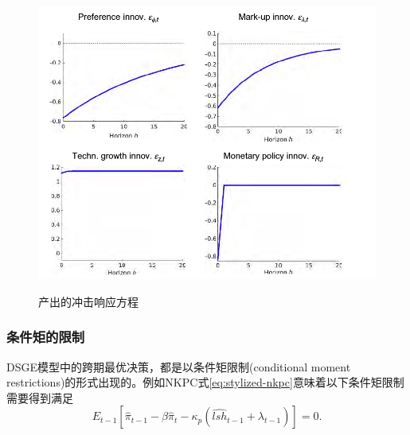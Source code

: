 \begin{figure}[htbp]
  \caption{产出的冲击响应方程}
  \centering
  \includegraphics[width=12cm]{./Figures/20180403-irfs-output}
  \label{fig:stylized-ssrep-irfs-output}
%
\end{figure}

\subsubsection{条件矩的限制}
\label{sec:stylized-ssrep-restrictions}
DSGE模型中的跨期最优决策，都是以条件矩限制(conditional moment restrictions)的形式出现的。例如NKPC式\eqref{eq:stylized-nkpc}意味着以下条件矩限制需要得到满足
\begin{equation}
  \label{eq:stylized-sspre-moment-nkpc}
  E_{t-1} \left[
  \hat{\pi}_{t-1} - \beta \hat{\pi}_{t} - \kappa_{p}
  \left(
  \widehat{lsh}_{t-1} + \lambda_{t-1}
  \right)
  \right] = 0.
\end{equation}

